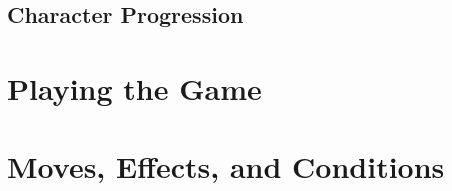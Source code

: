 \documentclass[
  11pt,
  letterpaper,
]{scrbook}
\begin{document}
\chapter{Character Progression}\label{character-progression}

\part{Playing the Game}

\chapter{}\label{section}

\chapter{}\label{section-1}

\chapter{}\label{section-2}

\chapter{}\label{section-3}

\chapter{}\label{section-4}

\chapter{}\label{section-5}

\chapter{}\label{section-6}

\chapter{}\label{section-7}

\part{Moves, Effects, and Conditions}

\chapter{}\label{section-8}
\end{document}
